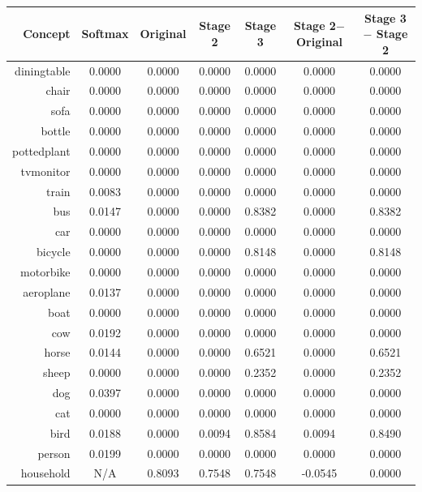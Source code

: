\documentclass[11pt,a4paper]{book}
\begin{document}
\begin{table}[htbp]
\centering
\begin{tabular}{r|c|c|c|c|c|c}
Concept & Softmax & Original & Stage 2 & Stage 3 & \makecell{Stage 2$-$\\Original} & \makecell{Stage 3$-$\\Stage 2}\\\hline
diningtable   & 0.0000 & 0.0000 & 0.0000 & 0.0000 & 0.0000 & 0.0000\\
chair         & 0.0000 & 0.0000 & 0.0000 & 0.0000 & 0.0000 & 0.0000\\
sofa          & 0.0000 & 0.0000 & 0.0000 & 0.0000 & 0.0000 & 0.0000\\
bottle        & 0.0000 & 0.0000 & 0.0000 & 0.0000 & 0.0000 & 0.0000\\
pottedplant   & 0.0000 & 0.0000 & 0.0000 & 0.0000 & 0.0000 & 0.0000\\
tvmonitor     & 0.0000 & 0.0000 & 0.0000 & 0.0000 & 0.0000 & 0.0000\\
train         & 0.0083 & 0.0000 & 0.0000 & 0.0000 & 0.0000 & 0.0000\\
bus           & 0.0147 & 0.0000 & 0.0000 & 0.8382 & 0.0000 & 0.8382\\
car           & 0.0000 & 0.0000 & 0.0000 & 0.0000 & 0.0000 & 0.0000\\
bicycle       & 0.0000 & 0.0000 & 0.0000 & 0.8148 & 0.0000 & 0.8148\\
motorbike     & 0.0000 & 0.0000 & 0.0000 & 0.0000 & 0.0000 & 0.0000\\
aeroplane     & 0.0137 & 0.0000 & 0.0000 & 0.0000 & 0.0000 & 0.0000\\
boat          & 0.0000 & 0.0000 & 0.0000 & 0.0000 & 0.0000 & 0.0000\\
cow           & 0.0192 & 0.0000 & 0.0000 & 0.0000 & 0.0000 & 0.0000\\
horse         & 0.0144 & 0.0000 & 0.0000 & 0.6521 & 0.0000 & 0.6521\\
sheep         & 0.0000 & 0.0000 & 0.0000 & 0.2352 & 0.0000 & 0.2352\\
dog           & 0.0397 & 0.0000 & 0.0000 & 0.0000 & 0.0000 & 0.0000\\
cat           & 0.0000 & 0.0000 & 0.0000 & 0.0000 & 0.0000 & 0.0000\\
bird          & 0.0188 & 0.0000 & 0.0094 & 0.8584 & 0.0094 & 0.8490\\
person        & 0.0199 & 0.0000 & 0.0000 & 0.0000 & 0.0000 & 0.0000\\\hline
household     & N/A    & 0.8093 & 0.7548 & 0.7548 & -0.0545 & 0.0000\\

\end{tabular}
\end{table}
\end{document}
